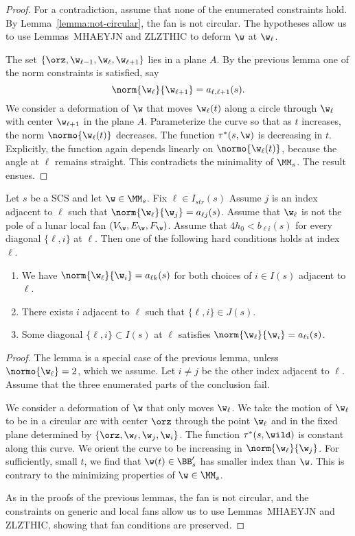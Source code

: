 \begin{proof} 
For a contradiction, assume that none of the enumerated constraints hold.
By Lemma~\ref{lemma:not-circular}, the fan is not circular.
The hypotheses
allow us to use Lemmas~MHAEYJN and
ZLZTHIC to deform $\w$ at $\w_\ell$.

The set $\{\orz,\w_{\ell-1},\w_\ell,\w_{\ell+1}\}$ lies in a plane $A$.
By the previous
lemma one of the norm constraints is satisfied, say
\[
\norm{\w_\ell}{\w_{\ell+1}}=a_{\ell,\ell+1}(s).
\]
We consider a  deformation of $\w$ that moves
 $\w_\ell(t)$ along a circle through
 $\w_\ell$ with center $\w_{\ell+1}$ in the plane $A$.  Parameterize the curve
so that as $t$ increases, the norm $\normo{\w_\ell(t)}$ decreases.
The function $\tau^*(s,\w)$ is decreasing in $t$.  Explicitly, the
function again depends linearly on $\normo{\w_\ell(t)}$, because
the angle at $\ell$ remains straight.  This contradicts the minimality of
$\MM_s$. 
The result ensues.
\end{proof}

\begin{lemma}\label{lemma:nux2}
Let $s$ be a SCS and let $\w\in \MM_s$.   Fix $\ell\in I_{str}(s)$
Assume $j$ is an index adjacent to $\ell$ such  that $\norm{\w_\ell}{\w_j}=a_{\ell j}(s)$.
Assume  that $\w_\ell$ is not the pole of a lunar local fan $(V_\w,E_\w,F_\w)$.
Assume that $4h_0 < b_{\ell i}(s)$ for every diagonal $\{\ell,i\}$ at $\ell$.
Then
one of the following hard conditions holds at index $\ell$.
\begin{enumerate}
\item We have $\norm{\w_\ell}{\w_i}=a_{\ell k}(s)$
for both choices of $i\in I(s)$ adjacent to $\ell$.
\item There exists $i$ adjacent to $\ell$ such that $\{\ell,i\}\in J(s)$.
\item Some diagonal $\{\ell,i\}\subset I(s)$ at $\ell$ satisfies
$\norm{\w_\ell}{\w_i}=a_{\ell i}(s)$.
\end{enumerate}
\end{lemma}

\begin{proof} 
The lemma is a special
case of the previous lemma, unless $\normo{\w_\ell}=2$, which we assume.
Let $i\ne j$ be the other index adjacent to $\ell$.
Assume that the three enumerated parts of the conclusion fail.

We consider a deformation of $\w$ that only moves $\w_\ell$.  We take
the motion of $\w_\ell$ to be
in a circular arc with center $\orz$ through the point $\w_\ell$ and in
the fixed plane determined by $\{\orz,\w_\ell,\w_j,\w_{i}\}$.  
The function $\tau^*(s,\wild)$ is
constant along this curve.  We orient the curve to be increasing
in $\norm{\w_\ell}{\w_{j}}$.  For sufficiently, small $t$, we find that
$\w(t)\in\BB'_s$ has smaller index than $\w$.  This is contrary to the minimizing
properties of $\w\in\MM_s$.

As in the proofs of the previous lemmas, the fan is not circular, and 
the constraints on generic and local fans
allow us to use Lemmas~MHAEYJN and
ZLZTHIC, showing that fan conditions are preserved.
\end{proof}

